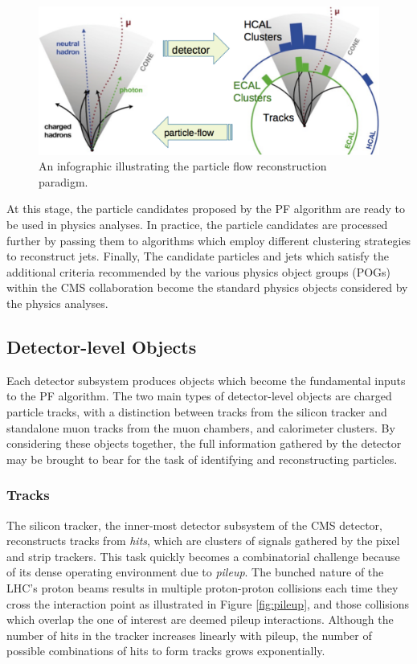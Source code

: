 \begin{figure}[htbp]
  \centering
    \includegraphics[width=5in]{images/pfdiagram}
    \caption[Particle Flow Infographic]{An infographic illustrating the particle flow reconstruction paradigm.\cite{pfdiagram}}
    \label{fig:pfdiagram}
\end{figure}

At this stage, the particle candidates proposed by the PF algorithm are ready to be used in physics analyses. In practice, the particle candidates are processed further by passing them to algorithms which employ different clustering strategies to reconstruct jets. Finally, The candidate particles and jets which satisfy the additional criteria recommended by the various physics object groups (POGs) within the CMS collaboration become the standard physics objects considered by the physics analyses.

\subsection{Detector-level Objects}

Each detector subsystem produces objects which become the fundamental inputs to the PF algorithm. The two main types of detector-level objects are charged particle tracks, with a distinction between tracks from the silicon tracker and standalone muon tracks from the muon chambers, and calorimeter clusters. By considering these objects together, the full information gathered by the detector may be brought to bear for the task of identifying and reconstructing particles.

\subsubsection{Tracks}

The silicon tracker, the inner-most detector subsystem of the CMS detector, reconstructs tracks from \textit{hits}, which are clusters of signals gathered by the pixel and strip trackers. This task quickly becomes a combinatorial challenge because of its dense operating environment due to \textit{pileup}. The bunched nature of the LHC's proton beams results in multiple proton-proton collisions each time they cross the interaction point as illustrated in Figure \ref{fig:pileup}, and those collisions which overlap the one of interest are deemed pileup interactions. Although the number of hits in the tracker increases linearly with pileup, the number of possible combinations of hits to form tracks grows exponentially.

